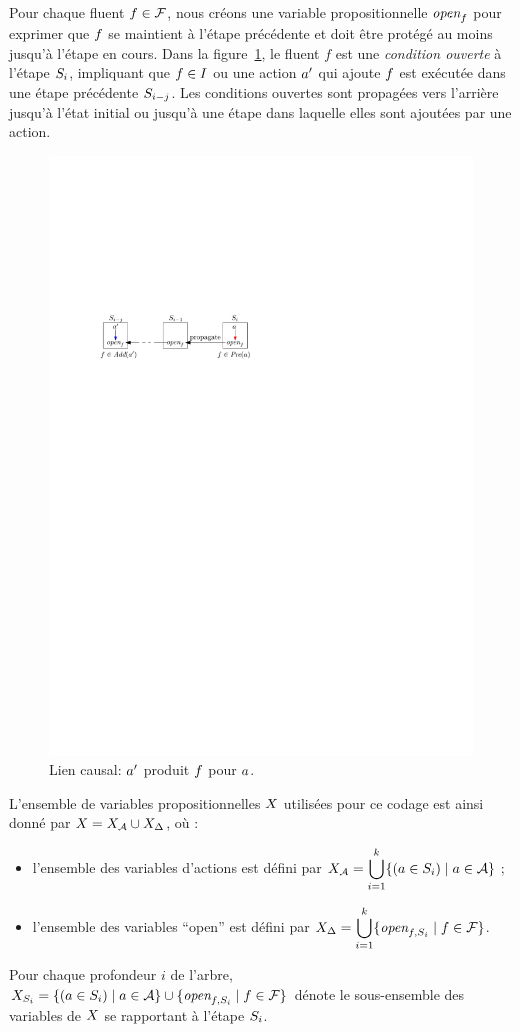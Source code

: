 Pour chaque %
fluent $\f\in\F$, nous créons une variable propositionnelle $\openSingle{\f}$ pour exprimer que $\f$ se maintient à l'étape précédente et doit être protégé au moins jusqu'à l'étape en cours.
Dans la figure~\ref{fig:causal-link-cte}, %
le fluent $f$ est une \textit {condition ouverte} à l'étape $\S_i$, impliquant que $\f\in\I$ ou une action $\b$ qui ajoute $\f$
est exécutée dans une étape précédente $\S_{i-j}$.
Les conditions ouvertes sont propagées vers l'arrière jusqu'à l'état initial ou jusqu'à une étape dans laquelle elles sont ajoutées par une action.


\begin{figure}[hb!]\centering
	\includegraphics[width=.5\textwidth]{figures/transitions}
    \caption{Lien causal: $\b$ produit $\f$ pour $\a$.}
    \label{fig:causal-link-cte}
\end{figure}


L'ensemble de variables propositionnelles $\X$ utilisées pour ce codage est ainsi donné par $\X = \X_{\A} \cup \X_{\Delta}$, où :
\begin{itemize}
    \item l'ensemble des variables d'actions est défini par $\displaystyle\X_{\A}=\bigcup_{i=1}^{\depth}\{\instepcte{a}{i}\mid \a\in\A\}$ ;
    \item l'ensemble des variables \enquote{open} est défini par $\displaystyle\X_{\Delta}=\bigcup_{i=1}^{\depth}\{\openstepcte{f}{i}\mid \f\in\F\}$.
\end{itemize}
Pour chaque profondeur $i$ de l'arbre, $\X_{\step{i}}=\{\instepcte{a}{i}\mid \a\in\A\}\cup\{\openstepcte{f}{i}\mid \f\in\F\}$ dénote le sous-ensemble des variables de $\X$ se rapportant à l'étape $\step{i}$.



